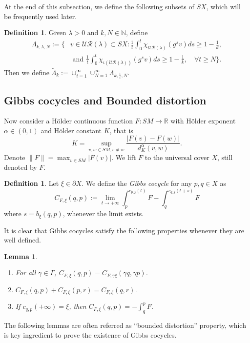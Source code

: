 \documentclass[11pt]{amsart}
\newtheorem{lemma}[theorem]{Lemma}
\theoremstyle{definition}
\newtheorem{definition}[theorem]{Definition}
\newcommand{\UR}{\mathcal{UR}}
\def\pX{{\partial X}}
\def\RR{{\mathbb R}}
\def\NN{{\mathbb N}}
\def\a{\alpha}
\def\c{\gamma}   \def\C{\Gamma}
\def\l{\lambda}   \def\L{\Lambda}
\begin{document}
At the end of this subsection, we define the following subsets of $SX$, which will be frequently used later. 
\begin{definition}\label{lsets}
Given $\l>0$ and $k,N\in \NN$, define
\begin{equation}\label{keyset}
    \begin{aligned}
    \L_{k,\l, N}:=\Big\{&v\in \UR(\l)\subset SX: \frac{1}{t}\int_0^t\chi_{\UR(\l)}(g^sv)ds\ge 1-\frac{1}{k},\\
    &\text{\ and \ }\frac{1}{t}\int_0^t\chi_{\iota(\UR(\l))}(g^sv)ds\ge 1-\frac{1}{k}, \quad \forall t\ge N\Big\}.
    \end{aligned}
\end{equation}
Then we define $\tilde\L_k:=\cup_{i=1}^\infty\cup_{N=1}^\infty \L_{k,\frac{1}{i},N}$.
\end{definition}
\subsection{Gibbs cocycles and Bounded distortion}
Now consider a H\"{o}lder continuous function $F:SM\to \RR$ with  H\"{o}lder exponent $\a\in (0,1)$ and H\"{o}lder constant $K$, that is 
$$K=\sup_{v,w\in SM, v\neq w}\frac{|F(v)-F(w)|}{d_K^\a(v,w)}.$$ 
Denote $\|F\|=\max_{v\in SM}|F(v)|$.
We lift $F$ to the universal cover $X$, still denoted by $F$. 

\begin{definition}\label{cocdef}
Let $\xi\in \pX$. We define the \emph{Gibbs cocycle} for any $p, q\in X$ as
$$C_{F,\xi}(q,p):=\lim_{t\to +\infty}\int_{p}^{c_{p,\xi}(t)}F-\int_{q}^{c_{q,\xi}(t+s)}F$$
where $s=b_\xi(q,p)$, whenever the limit exists.
\end{definition}

It is clear that Gibbs cocycles satisfy the following properties whenever they are well defined.
\begin{lemma}\label{cocycleprop}
\begin{enumerate}
  \item For all $\c\in \Gamma$, $C_{F,\xi}(q,p)=C_{F,\c\xi}(\c q,\c p)$.
  \item $C_{F,\xi}(q,p)+C_{F,\xi}(p,r)=C_{F,\xi}(q,r)$.
  \item If $c_{q,p}(+\infty)=\xi$, then $C_{F,\xi}(q,p)=-\int_q^p F$.
\end{enumerate}
\end{lemma}

The following lemmas are often referred as ``bounded distortion'' property, which is key ingredient to prove the existence of Gibbs cocycles. 
\end{document}
